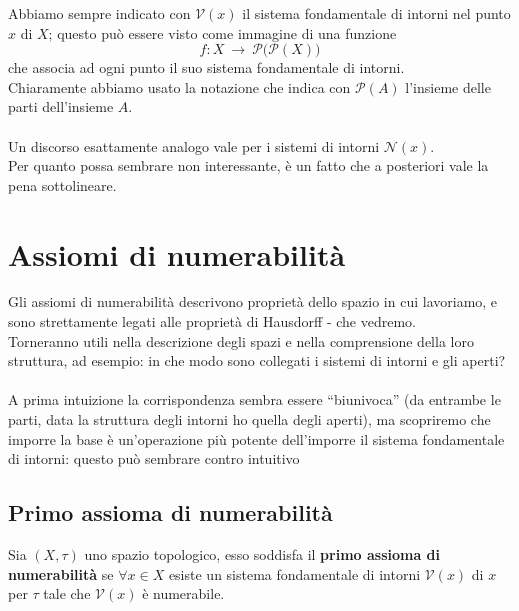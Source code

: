 \begin{remark} 
	Abbiamo sempre indicato con $\mathcal{V}(x)$ il sistema fondamentale di intorni nel punto $x$ di $X$; questo può essere visto come immagine di una funzione 
	\begin{equation*}
		f : X \ \rightarrow \ \mathcal{P}\big(\mathcal{P} (X) \big)
	\end{equation*}
	che associa ad ogni punto il suo sistema fondamentale di intorni. \\ Chiaramente abbiamo usato la notazione che indica con $\mathcal{P}(A)$ l'insieme delle parti dell'insieme $A$. \\ \\ Un discorso esattamente analogo vale per i sistemi di intorni $\mathcal{N}(x)$. \\ Per quanto possa sembrare non interessante, è un fatto che a posteriori vale la pena sottolineare.
\end{remark}


\newpage

\section{Assiomi di numerabilità}
Gli assiomi di numerabilità descrivono proprietà dello spazio in cui lavoriamo, e sono strettamente legati alle proprietà di Hausdorff - che vedremo. \\
Torneranno utili nella descrizione degli spazi e nella comprensione della loro struttura, ad esempio: in che modo sono collegati i sistemi di intorni e gli aperti? \\ \\A prima intuizione la corrispondenza sembra essere \enquote{biunivoca} (da entrambe le parti, data la struttura degli intorni ho quella degli aperti), ma scopriremo che imporre la base è un'operazione più potente dell'imporre il sistema fondamentale di intorni: questo può sembrare contro intuitivo
\subsection{\textcolor{TopGener}{\textbf{Primo assioma di numerabilità}}}


\begin{definition}
	Sia $(X,\tau)$ uno spazio topologico, esso soddisfa il \textbf{primo assioma di numerabilità} se $\forall x \in X$ esiste un sistema fondamentale di intorni $\mathcal{V}(x)$ di $x$ per $\tau$ tale che $\mathcal{V}(x)$ è numerabile.
\end{definition}

